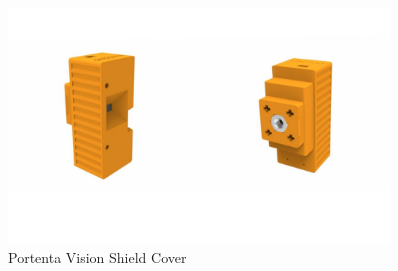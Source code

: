 \begin{frame}
	\begin{figure}[h!]
		\centering
		\includegraphics[width=0.9\textwidth]{images/PoretentaVisionShieldCover.jpg}
		\caption{Portenta Vision Shield Cover}
		\label{Cover}
	\end{figure}
\end{frame}


